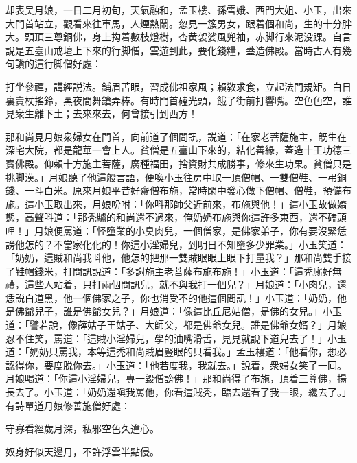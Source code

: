 却表吴月娘，一日二月初旬，天氣融和，孟玉樓、孫雪娥、西門大姐、小玉，出來大門首站立，觀看來往車馬，人煙熱鬧。忽見一簇男女，跟着個和尚，生的十分胖大。頭頂三尊銅佛，身上抅着數枝燈樹，杏黄袈娑風兜袖，赤脚行來泥没踝。自言說是五臺山戒壇上下來的行脚僧，雲遊到此，要化錢糧，蓋造佛殿。當時古人有幾句讚的這行脚僧好處：

打坐參禪，講經説法。鋪眉苫眼，習成佛祖家風；賴敎求食，立起法門規矩。白日裏賣杖搖鈴，黑夜間舞鎗弄棒。有時門首磕光頭，餓了街前打響嘴。空色色空，誰見衆生離下土；去來來去，何曾接引到西方！

那和尚見月娘衆婦女在門首，向前道了個問訊，説道：「在家老菩薩施主，旣生在深宅大院，都是龍華一會上人。貧僧是五臺山下來的，結化善緣，蓋造十王功德三寳佛殿。仰賴十方施主菩薩，廣種福田，捨資財共成勝事，修來生功果。貧僧只是挑脚漢。」月娘聽了他這般言語，便喚小玉往房中取一頂僧帽、一雙僧鞋、一弔銅錢、一斗白米。原來月娘平昔好齋僧布施，常時閑中發心做下僧帽、僧鞋，預備布施。這小玉取出來，月娘吩咐：「你呌那師父近前來，布施與他！」這小玉故做嬌態，高聲呌道：「那秃驢的和尚還不過來，俺奶奶布施與你這許多東西，還不磕頭哩！」月娘便罵道：「怪墮業的小臭肉兒，一個僧家，是佛家弟子，你有要沒緊恁謗他怎的？不當家化化的！你這小淫婦兒，到明日不知墮多少罪業。」小玉笑道：「奶奶，這賊和尚我呌他，他怎的把那一雙賊眼眼上眼下打量我？」那和尚雙手接了鞋帽錢米，打問訊說道：「多謝施主老菩薩布施布施！」小玉道：「這秃廝好無禮，這些人站着，只打兩個問訊兒，就不與我打一個兒？」月娘道：「小肉兒，還恁説白道黑，他一個佛家之子，你也消受不的他這個問訊！」小玉道：「奶奶，他是佛爺兒子，誰是佛爺女兒？」月娘道：「像這比丘尼姑僧，是佛的女兒。」小玉道：「譬若說，像薛姑子王姑子、大師父，都是佛爺女兒。誰是佛爺女婿？」月娘忍不住笑，罵道：「這賊小淫婦兒，學的油嘴滑舌，見見就說下道兒去了！」小玉道：「奶奶只罵我，本等這秃和尚賊眉豎眼的只看我。」孟玉樓道：「他看你，想必認得你，要度脱你去。」小玉道：「他若度我，我就去。」說着，衆婦女笑了一囘。月娘喝道：「你這小淫婦兒，專一毀僧謗佛！」那和尚得了布施，頂着三尊佛，揚長去了。小玉道：「奶奶還嗔我罵他，你看這賊秃，臨去還看了我一眼，纔去了。」有詩單道月娘修善施僧好處：

守寡看經歲月深，私邪空色久違心。

奴身好似天邊月，不許浮雲半點侵。

